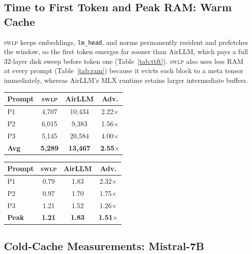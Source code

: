 \documentclass[10pt,a4paper]{article}
\newcommand{\swlp}{\textsc{swlp}}
\begin{document}
\subsection{Time to First Token and Peak RAM: Warm Cache}
\label{subsec:ttft}

\swlp{} keeps embeddings, \texttt{lm\_head}, and norms permanently resident and
prefetches the window, so the first token emerges far sooner than AirLLM, which
pays a full 32-layer disk sweep before token one (Table~\ref{tab:ttft}). \swlp{}
also uses less RAM at every prompt (Table~\ref{tab:ram}) because it evicts each
block to a meta tensor immediately, whereas AirLLM's MLX runtime retains larger
intermediate buffers.

\begin{minipage}[t]{0.48\linewidth}
\centering
{}
\label{tab:ttft}
\begin{tabular}{@{}lccc@{}}
\toprule
\textbf{Prompt} & \textbf{\swlp{}} & \textbf{AirLLM} & \textbf{Adv.} \\
\midrule
P1 & 4{,}707 & 10{,}434 & 2.22$\times$ \\
P2 & 6{,}015 & 9{,}383 & 1.56$\times$ \\
P3 & 5{,}145 & 20{,}584 & 4.00$\times$ \\
\midrule
\textbf{Avg} & \textbf{5{,}289} & \textbf{13{,}467} & \textbf{2.55$\times$} \\
\bottomrule
\end{tabular}
\end{minipage}\hfill
\begin{minipage}[t]{0.48\linewidth}
\centering
{}
\label{tab:ram}
\begin{tabular}{@{}lccc@{}}
\toprule
\textbf{Prompt} & \textbf{\swlp{}} & \textbf{AirLLM} & \textbf{Adv.} \\
\midrule
P1 & 0.79 & 1.83 & 2.32$\times$ \\
P2 & 0.97 & 1.70 & 1.75$\times$ \\
P3 & 1.21 & 1.52 & 1.26$\times$ \\
\midrule
\textbf{Peak} & \textbf{1.21} & \textbf{1.83} & \textbf{1.51$\times$} \\
\bottomrule
\end{tabular}
\end{minipage}

\subsection{Cold-Cache Measurements: Mistral-7B}
\label{subsec:cold}
\end{document}
